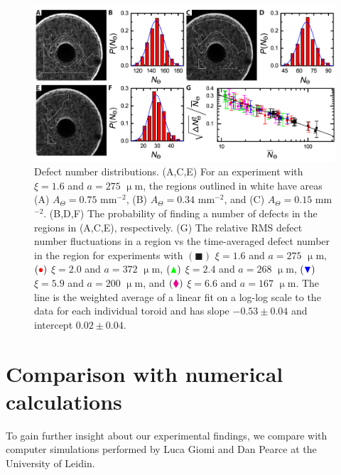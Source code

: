 \begin{figure}
  \centering
  \includegraphics{figures/C3/Ch3-Figs_ExpDistribution.png}
  \caption{Defect number distributions.
  (A,C,E) For an experiment with $\xi = 1.6$ and $a = 275$ $\upmu$m, the regions outlined in white have areas (A) $A_{\Theta} = 0.75$ mm$^{-2}$, (B) $A_{\Theta} = 0.34$ mm$^{-2}$, and (C) $A_{\Theta} = 0.15$ mm$^{-2}$.
  (B,D,F) The probability of finding a number of defects in the regions in (A,C,E), respectively.
  (G) The relative RMS defect number fluctuations in a region vs the time-averaged defect number in the region for experiments with
  $({\blacksquare})$ $\xi = 1.6 $ and $a = 275$ $\upmu$m,
  $({\color{red} \bullet})$ $\xi = 2.0 $ and $a = 372$ $\upmu$m,
  $({\color{green} \blacktriangle})$ $\xi = 2.4 $ and $a = 268$ $\upmu$m,
  $({\color{blue} \blacktriangledown})$ $\xi = 5.9$ and $a = 200$ $\upmu$m, and
  $({\color{magenta} \blacklozenge})$ $\xi = 6.6$ and $a = 167$ $\upmu$m.
  The line is the weighted average of a linear fit on a log-log scale to the data for each individual toroid and has slope $-0.53 \pm 0.04$ and intercept $0.02 \pm 0.04$.}\label{f:3-ExpDistribution}
\end{figure}



\section{Comparison with numerical calculations}
To gain further insight about our experimental findings, we compare with computer simulations performed by Luca Giomi and Dan Pearce at the University of Leidin.


